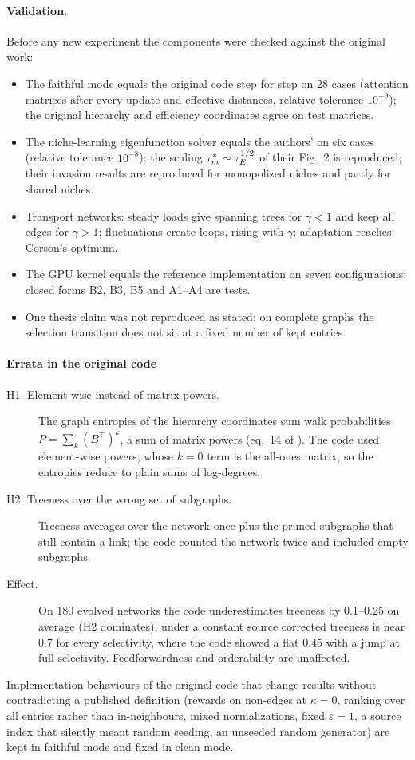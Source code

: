 \paragraph{Validation.} Before any new experiment the components were checked against the original work:
\begin{itemize}
  \item The faithful mode equals the original code step for step on 28 cases (attention matrices after every update and
    effective distances, relative tolerance $10^{-9}$); the original hierarchy and efficiency coordinates agree on test
    matrices.
  \item The niche-learning eigenfunction solver equals the authors' on six cases (relative tolerance $10^{-8}$); the
    scaling $\tau_m^*\sim\tau_E^{1/2}$ of their Fig.~2 is reproduced; their invasion results are reproduced for monopolized
    niches and partly for shared niches.
  \item Transport networks: steady loads give spanning trees for $\gamma<1$ and keep all edges for $\gamma>1$;
    fluctuations create loops, rising with $\gamma$; adaptation reaches Corson's optimum.
  \item The GPU kernel equals the reference implementation on seven configurations; closed forms B2, B3, B5 and A1--A4 are
    tests.
  \item One thesis claim was not reproduced as stated: on complete graphs the selection transition does not sit at a fixed
    number of kept entries.
\end{itemize}

\paragraph{Errata in the original code}\label{app:errata}
\begin{description}
  \item[H1. Element-wise instead of matrix powers.] The graph entropies of the hierarchy coordinates sum walk
    probabilities $P=\sum_k(B^\top)^k$, a sum of matrix powers (eq.~14 of \citealp{corominas2013originsheirarchy}). The code
    used element-wise powers, whose $k=0$ term is the all-ones matrix, so the entropies reduce to plain sums of
    log-degrees.
  \item[H2. Treeness over the wrong set of subgraphs.] Treeness averages over the network once plus the pruned subgraphs
    that still contain a link; the code counted the network twice and included empty subgraphs.
  \item[Effect.] On 180 evolved networks the code underestimates treeness by 0.1--0.25 on average (H2 dominates);
    under a constant source corrected treeness is near 0.7 for every selectivity, where the code showed a flat 0.45 with a
    jump at full selectivity. Feedforwardness and orderability are unaffected.
\end{description}
Implementation behaviours of the original code that change results without contradicting a published definition
(rewards on non-edges at $\kappa=0$, ranking over all entries rather than in-neighbours, mixed normalizations, fixed
$\varepsilon=1$, a source index that silently meant random seeding, an unseeded random generator) are kept in faithful mode
and fixed in clean mode.
